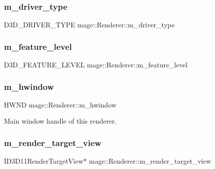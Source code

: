 \subsubsection{\texorpdfstring{m\+\_\+driver\+\_\+type}{m\_driver\_type}}
{\footnotesize\ttfamily D3\+D\+\_\+\+D\+R\+I\+V\+E\+R\+\_\+\+T\+Y\+PE mage\+::\+Renderer\+::m\+\_\+driver\+\_\+type\hspace{0.3cm}{\ttfamily [protected]}}

\hypertarget{classmage_1_1_renderer_aa97b108ef58f7d41ddb527f6ba2bfdf9}{}\label{classmage_1_1_renderer_aa97b108ef58f7d41ddb527f6ba2bfdf9} 
\subsubsection{\texorpdfstring{m\+\_\+feature\+\_\+level}{m\_feature\_level}}
{\footnotesize\ttfamily D3\+D\+\_\+\+F\+E\+A\+T\+U\+R\+E\+\_\+\+L\+E\+V\+EL mage\+::\+Renderer\+::m\+\_\+feature\+\_\+level\hspace{0.3cm}{\ttfamily [protected]}}

\hypertarget{classmage_1_1_renderer_afc314c8b146c3709edfd5349257a8387}{}\label{classmage_1_1_renderer_afc314c8b146c3709edfd5349257a8387} 
\subsubsection{\texorpdfstring{m\+\_\+hwindow}{m\_hwindow}}
{\footnotesize\ttfamily H\+W\+ND mage\+::\+Renderer\+::m\+\_\+hwindow\hspace{0.3cm}{\ttfamily [protected]}}

Main window handle of this renderer. \hypertarget{classmage_1_1_renderer_a60eeb3b440c2c8a027b583ab93830d73}{}\label{classmage_1_1_renderer_a60eeb3b440c2c8a027b583ab93830d73} 
\subsubsection{\texorpdfstring{m\+\_\+render\+\_\+target\+\_\+view}{m\_render\_target\_view}}
{\footnotesize\ttfamily I\+D3\+D11\+Render\+Target\+View$\ast$ mage\+::\+Renderer\+::m\+\_\+render\+\_\+target\+\_\+view\hspace{0.3cm}{\ttfamily [protected]}}

